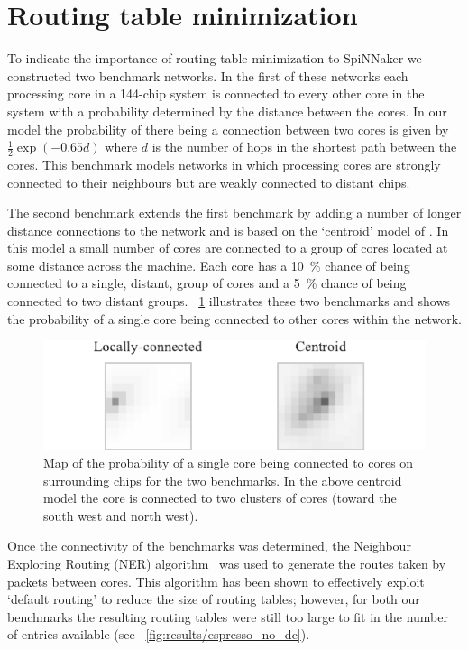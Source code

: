 \documentclass[conference]{IEEEtran}
\begin{document}
\section{Routing table minimization}

To indicate the importance of routing table minimization to SpiNNaker we constructed two benchmark networks.
In the first of these networks each processing core in a 144-chip system is connected to every other core in the system with a probability determined by the distance between the cores.
In our model the probability of there being a connection between two cores is given by $\frac{1}{2}\exp(-0.65d)$ where $d$ is the number of hops in the shortest path between the cores.
This benchmark models networks in which processing cores are strongly connected to their neighbours but are weakly connected to distant chips.

The second benchmark extends the first benchmark by adding a number of longer distance connections to the network and is based on the `centroid' model of \textcite{Navaridas2015}.
In this model a small number of cores are connected to a group of cores located at some distance across the machine.
Each core has a \SI{10}{\percent} chance of being connected to a single, distant, group of cores and a \SI{5}{\percent} chance of being connected to two distant groups.
\figurename~\ref{fig:experiment/setup} illustrates these two benchmarks and shows the probability of a single core being connected to other cores within the network.

\begin{figure}
  \centering
  \includegraphics{experiments/experiments.pdf}
  \caption{Map of the probability of a single core being connected to cores on surrounding chips for the two benchmarks.
           In the above centroid model the core is connected to two clusters of cores (toward the south west and north west).}
  \label{fig:experiment/setup}
\end{figure}

Once the connectivity of the benchmarks was determined, the Neighbour Exploring Routing (NER) algorithm~\parencite{Navaridas2015} was used to generate the routes taken by packets between cores.
This algorithm has been shown to effectively exploit `default routing' to reduce the size of routing tables; however, for both our benchmarks the resulting routing tables were still too large to fit in the number of entries available (see \figurename~\ref{fig:results/espresso_no_dc}).
\end{document}
